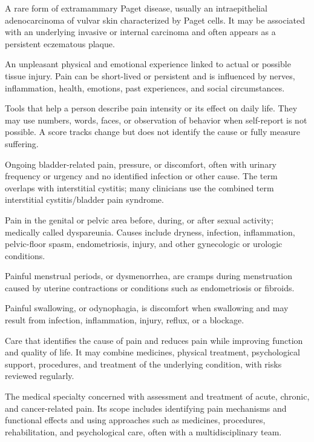  A rare form of extramammary Paget disease, usually an intraepithelial adenocarcinoma of vulvar skin characterized by Paget cells. It may be associated with an underlying invasive or internal carcinoma and often appears as a persistent eczematous plaque.

 An unpleasant physical and emotional experience linked to actual or possible tissue injury. Pain can be short-lived or persistent and is influenced by nerves, inflammation, health, emotions, past experiences, and social circumstances.

 Tools that help a person describe pain intensity or its effect on daily life. They may use numbers, words, faces, or observation of behavior when self-report is not possible. A score tracks change but does not identify the cause or fully measure suffering.

 Ongoing bladder-related pain, pressure, or discomfort, often with urinary frequency or urgency and no identified infection or other cause. The term overlaps with interstitial cystitis; many clinicians use the combined term interstitial cystitis/bladder pain syndrome.

 Pain in the genital or pelvic area before, during, or after sexual activity; medically called dyspareunia. Causes include dryness, infection, inflammation, pelvic-floor spasm, endometriosis, injury, and other gynecologic or urologic conditions.

 Painful menstrual periods, or dysmenorrhea, are cramps during menstruation caused by uterine contractions or conditions such as endometriosis or fibroids.

 Painful swallowing, or odynophagia, is discomfort when swallowing and may result from infection, inflammation, injury, reflux, or a blockage.

 Care that identifies the cause of pain and reduces pain while improving function and quality of life. It may combine medicines, physical treatment, psychological support, procedures, and treatment of the underlying condition, with risks reviewed regularly.

 The medical specialty concerned with assessment and treatment of acute, chronic,
and cancer-related pain. Its scope includes identifying pain mechanisms and functional
effects and using approaches such as medicines, procedures, rehabilitation, and
psychological care, often with a multidisciplinary team.

